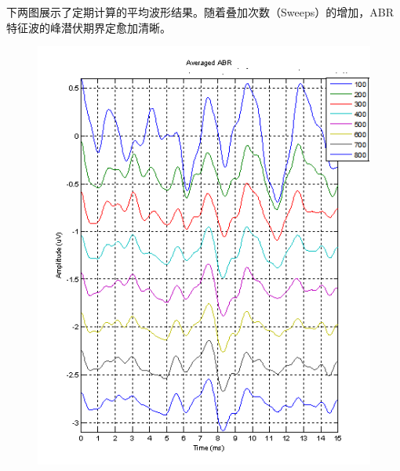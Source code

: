 下两图展示了定期计算的平均波形结果。随着叠加次数（Sweeps）的增加，ABR特征波的峰潜伏期界定愈加清晰。
\begin{figure}[H]
    \centering
    \begin{minipage}{0.48\textwidth}
        \includegraphics[width=\textwidth]{images/improvingSNRwaveformAveraging75.png}
    \end{minipage}
    \hfill
    \begin{minipage}{0.48\textwidth}

\end{minipage}
\end{figure}

